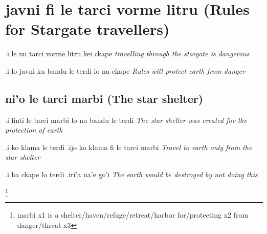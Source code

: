 \documentclass{article}
\newcommand{\para}[2]{#1 \emph{#2}}
\newcommand{\usefulWord}[2]{\footnote{#1 #2}}
\begin{document}
\section{javni fi le tarci vorme litru (Rules for Stargate travellers)}

\para{.i le nu tarci vorme litru kei ckape}{travelling through the stargate is dangerous}

\para{.i lo javni ku bandu le terdi lo nu ckape}{Rules will protect earth from danger}

\subsection{ni'o le tarci marbi (The star shelter)}

\para{.i finti le tarci marbi lo nu bandu le terdi}{The star shelter was created for the protection of earth}

\para{.i ko klama le terdi .ijo ko klama fi le tarci marbi}{Travel to earth only from the star shelter}

\para{.i ba ckape lo terdi .iri'a na'e go'i}{The earth would be destroyed by not doing this}



\usefulWord{marbi}{x1 is a shelter/haven/refuge/retreat/harbor for/protecting x2 from danger/threat x3}
\end{document}
